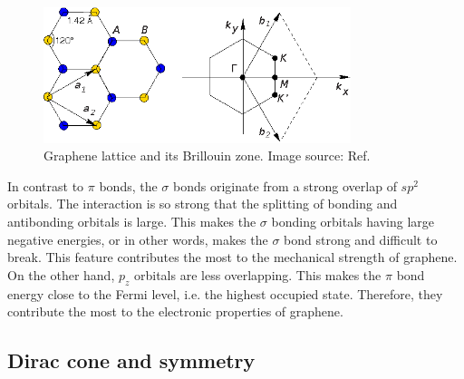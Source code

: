 \begin{figure}[htbp!] 
\centering  
\includegraphics[width=0.8\textwidth]{gra_lat.eps}
\caption[Graphene lattice and its Brillouin zone]{ Graphene lattice and its Brillouin zone. Image source: Ref. \cite{CastroNeto2009} }  
\label{fig:gra_lat}
\end{figure} 

In contrast to $\pi$ bonds, the $\sigma$ bonds originate from a strong overlap of $sp^2$ orbitals. The interaction is so strong that the splitting of bonding and antibonding orbitals is large. This makes the $\sigma$ bonding orbitals having large negative energies, or in other words, makes the $\sigma$ bond strong and difficult to break. This feature contributes the most to the mechanical strength of graphene. On the other hand, $p_z$ orbitals are less overlapping. This makes the $\pi$ bond energy close to the Fermi level, i.e. the highest occupied state. Therefore, they contribute the most to the electronic properties of graphene.  


\subsection{Dirac cone and symmetry}

